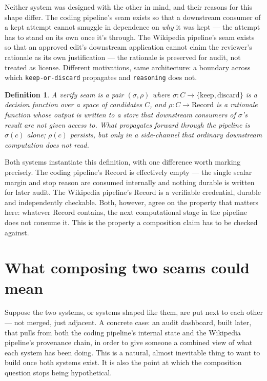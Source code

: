 \documentclass[11pt,openany]{book}
\newtheorem{definition}[proposition]{Definition}
\begin{document}
Neither system was designed with the other in mind, and their reasons for this shape differ. The coding pipeline's seam exists so that a downstream consumer of a kept attempt cannot smuggle in dependence on \emph{why} it was kept — the attempt has to stand on its own once it's through. The Wikipedia pipeline's seam exists so that an approved edit's downstream application cannot claim the reviewer's rationale as its own justification — the rationale is preserved for audit, not treated as license. Different motivations, same architecture: a boundary across which \texttt{keep-or-discard} propagates and \texttt{reasoning} does not.

\begin{definition}
A \emph{verify seam} is a pair $(\sigma, \rho)$ where $\sigma: C \to \{\mathrm{keep}, \mathrm{discard}\}$ is a decision function over a space of candidates $C$, and $\rho: C \to \mathrm{Record}$ is a rationale function whose output is written to a store that downstream consumers of $\sigma$'s result are not given access to. What propagates forward through the pipeline is $\sigma(c)$ alone; $\rho(c)$ persists, but only in a side-channel that ordinary downstream computation does not read.
\end{definition}

Both systems instantiate this definition, with one difference worth marking precisely. The coding pipeline's $\mathrm{Record}$ is effectively empty — the single scalar margin and stop reason are consumed internally and nothing durable is written for later audit. The Wikipedia pipeline's $\mathrm{Record}$ is a verifiable credential, durable and independently checkable. Both, however, agree on the property that matters here: whatever $\mathrm{Record}$ contains, the next computational stage in the pipeline does not consume it. This is the property a composition claim has to be checked against.

\section{What composing two seams could mean}

Suppose the two systems, or systems shaped like them, are put next to each other — not merged, just adjacent. A concrete case: an audit dashboard, built later, that pulls from both the coding pipeline's internal state and the Wikipedia pipeline's provenance chain, in order to give someone a combined view of what each system has been doing. This is a natural, almost inevitable thing to want to build once both systems exist. It is also the point at which the composition question stops being hypothetical.
\end{document}
